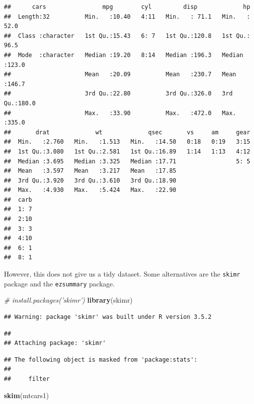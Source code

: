 \documentclass[12pt,letterpaperpaper,openany]{book}
\newenvironment{Shaded}{\begin{snugshade}}{\end{snugshade}}
\newcommand{\CommentTok}[1]{\textcolor[rgb]{0.56,0.35,0.01}{\textit{#1}}}
\newcommand{\KeywordTok}[1]{\textcolor[rgb]{0.13,0.29,0.53}{\textbf{#1}}}
\newcommand{\NormalTok}[1]{#1}
\begin{document}
\begin{verbatim}
##      cars                mpg        cyl         disp             hp       
##  Length:32          Min.   :10.40   4:11   Min.   : 71.1   Min.   : 52.0  
##  Class :character   1st Qu.:15.43   6: 7   1st Qu.:120.8   1st Qu.: 96.5  
##  Mode  :character   Median :19.20   8:14   Median :196.3   Median :123.0  
##                     Mean   :20.09          Mean   :230.7   Mean   :146.7  
##                     3rd Qu.:22.80          3rd Qu.:326.0   3rd Qu.:180.0  
##                     Max.   :33.90          Max.   :472.0   Max.   :335.0  
##       drat             wt             qsec       vs     am     gear  
##  Min.   :2.760   Min.   :1.513   Min.   :14.50   0:18   0:19   3:15  
##  1st Qu.:3.080   1st Qu.:2.581   1st Qu.:16.89   1:14   1:13   4:12  
##  Median :3.695   Median :3.325   Median :17.71                 5: 5  
##  Mean   :3.597   Mean   :3.217   Mean   :17.85                       
##  3rd Qu.:3.920   3rd Qu.:3.610   3rd Qu.:18.90                       
##  Max.   :4.930   Max.   :5.424   Max.   :22.90                       
##  carb  
##  1: 7  
##  2:10  
##  3: 3  
##  4:10  
##  6: 1  
##  8: 1
\end{verbatim}

However, this does not give us a tidy dataset. Some alternatives are the \texttt{skimr} package and
the \texttt{ezsummary} package.

\begin{Shaded}
\begin{Highlighting}[]
\CommentTok{# install.packages('skimr')}
\KeywordTok{library}\NormalTok{(skimr)}
\end{Highlighting}
\end{Shaded}

\begin{verbatim}
## Warning: package 'skimr' was built under R version 3.5.2
\end{verbatim}

\begin{verbatim}
## 
## Attaching package: 'skimr'
\end{verbatim}

\begin{verbatim}
## The following object is masked from 'package:stats':
## 
##     filter
\end{verbatim}

\begin{Shaded}
\begin{Highlighting}[]
\KeywordTok{skim}\NormalTok{(mtcars1)}
\end{Highlighting}
\end{Shaded}
\end{document}
